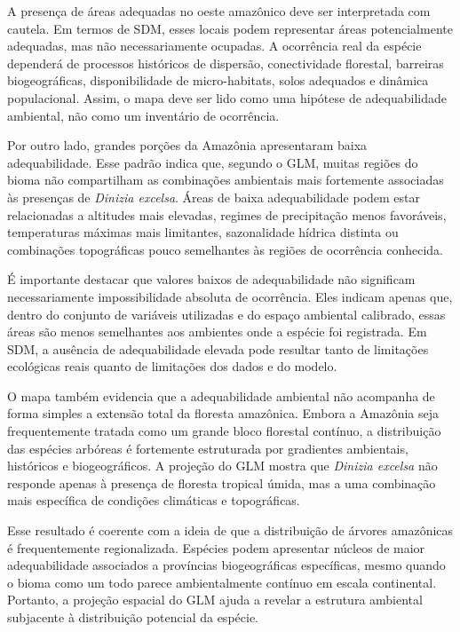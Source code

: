 A presença de áreas adequadas no oeste amazônico deve ser interpretada com cautela. Em termos de SDM, esses locais podem representar áreas potencialmente adequadas, mas não necessariamente ocupadas. A ocorrência real da espécie dependerá de processos históricos de dispersão, conectividade florestal, barreiras biogeográficas, disponibilidade de micro-habitats, solos adequados e dinâmica populacional. Assim, o mapa deve ser lido como uma hipótese de adequabilidade ambiental, não como um inventário de ocorrência.

Por outro lado, grandes porções da Amazônia apresentaram baixa adequabilidade. Esse padrão indica que, segundo o GLM, muitas regiões do bioma não compartilham as combinações ambientais mais fortemente associadas às presenças de \textit{Dinizia excelsa}. Áreas de baixa adequabilidade podem estar relacionadas a altitudes mais elevadas, regimes de precipitação menos favoráveis, temperaturas máximas mais limitantes, sazonalidade hídrica distinta ou combinações topográficas pouco semelhantes às regiões de ocorrência conhecida.

É importante destacar que valores baixos de adequabilidade não significam necessariamente impossibilidade absoluta de ocorrência. Eles indicam apenas que, dentro do conjunto de variáveis utilizadas e do espaço ambiental calibrado, essas áreas são menos semelhantes aos ambientes onde a espécie foi registrada. Em SDM, a ausência de adequabilidade elevada pode resultar tanto de limitações ecológicas reais quanto de limitações dos dados e do modelo.

O mapa também evidencia que a adequabilidade ambiental não acompanha de forma simples a extensão total da floresta amazônica. Embora a Amazônia seja frequentemente tratada como um grande bloco florestal contínuo, a distribuição das espécies arbóreas é fortemente estruturada por gradientes ambientais, históricos e biogeográficos. A projeção do GLM mostra que \textit{Dinizia excelsa} não responde apenas à presença de floresta tropical úmida, mas a uma combinação mais específica de condições climáticas e topográficas.

Esse resultado é coerente com a ideia de que a distribuição de árvores amazônicas é frequentemente regionalizada. Espécies podem apresentar núcleos de maior adequabilidade associados a províncias biogeográficas específicas, mesmo quando o bioma como um todo parece ambientalmente contínuo em escala continental. Portanto, a projeção espacial do GLM ajuda a revelar a estrutura ambiental subjacente à distribuição potencial da espécie.

